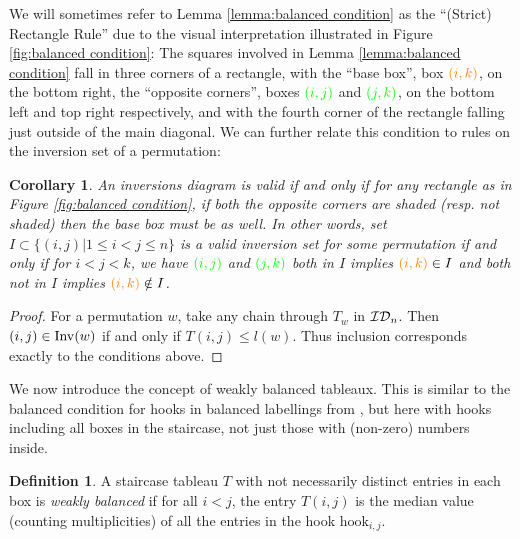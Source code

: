 \documentclass{article}
\newtheorem{corollary}[theorem]{Corollary}
\theoremstyle{definition}
\newtheorem{definition}[theorem]{Definition} %
\begin{document}
 We will sometimes refer to Lemma \ref{lemma:balanced condition} as the ``(Strict) Rectangle Rule'' due to the visual interpretation illustrated in Figure \ref{fig:balanced condition}: The squares involved in Lemma \ref{lemma:balanced condition} fall in three corners of a rectangle, with the ``base box'', box $\textcolor{orange}{(i,k)}$, on the bottom right, the ``opposite corners'', boxes $\textcolor{green}{(i,j)}$ and $\textcolor{green}{(j,k)}$, on the bottom left and top right respectively, and with the fourth corner of the rectangle falling just outside of the main diagonal. We can further relate this condition to rules on the inversion set of a permutation: 

\begin{corollary}
    \label{cor:inversion shape}
An inversions diagram is valid if and only if for any rectangle as in Figure \ref{fig:balanced condition}, if both the opposite corners are shaded (resp. not shaded) then the base box must be as well.
In other words, set $I \subset \{(i,j)| 1 \leq i < j \leq n\}$ is a valid inversion set for some permutation if and only if for $i<j<k$, we have $\textcolor{green}{(i,j)}$ and $\textcolor{green}{(j,k)}$ both in $I$ implies $\textcolor{orange}{(i,k)} \in I$ and both not in $I$ implies $\textcolor{orange}{(i,k)} \notin I$.
\end{corollary}

\begin{proof}
 For a permutation $w$, take any chain through $T_w$ in $\mathcal{ID}_{n}$. Then $(i,j) \in \mathrm{Inv}(w)$ if and only if $T(i,j) \leq l(w)$. Thus inclusion corresponds exactly to the conditions above.
\end{proof}
 



We now introduce the concept of weakly balanced tableaux. This is similar
 to the balanced condition for hooks in balanced labellings from \cite{balancedlabellings}, but here with hooks including all boxes in the staircase, not just those with (non-zero) numbers inside.


\begin{definition}
    A staircase tableau $T$ with not necessarily distinct entries in each box is \emph{weakly balanced} if for all $i<j$, the entry $T(i,j)$ is the median value (counting multiplicities) of all the entries in the hook $\text{hook}_{i,j}$.
\end{definition}
\end{document}
